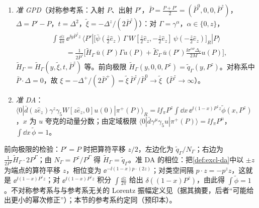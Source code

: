 \begin{definition}[准 GPD 与准 DA]\label{def:lamet-quasi-gpd}
\begin{enumerate}[label=(\roman*),leftmargin=2em,itemsep=1pt,topsep=2pt]
\item \emph{准 GPD}（对称参考系：入射 $P$、出射 $P'$，$\bar P=\frac{P+P'}2=(\bar P^0,0,0,\bar P^z)$，$\Delta=P'-P$，$t=\Delta^2$，$\tilde\xi=-\Delta^z/(2\bar P^z)$）：对 $\Gamma=\gamma^\alpha$，$\alpha\in\{0,z\}$，
\begin{equation}\label{eq:lamet-quasi-gpd}
\begin{split}
&\int\frac{\dd z}{4\pi}\,\ee^{\ii y\bar P^zz}\,\langle P'|\big[\bar\psi(\tfrac z2\hat e_z)\,\Gamma\, W[\tfrac z2\hat e_z,-\tfrac z2\hat e_z]\,\psi(-\tfrac z2\hat e_z)\big]_R|P\rangle\\
&\qquad=\frac1{2\bar P^z}\Big[\tilde H_\Gamma\,\bar u(P')\Gamma u(P)+\tilde E_\Gamma\,\bar u(P')\frac{\ii\sigma^{\alpha\nu}\Delta_\nu}{2M}u(P)\Big],
\end{split}
\end{equation}
$\tilde H_\Gamma=\tilde H_\Gamma(y,\tilde\xi,t,\bar P^z)$ 等。前向极限 $\tilde H_\Gamma(y,0,0,P^z)=\tilde q_\Gamma(y,P^z)$。对称系中 $\bar P\cdot\Delta=0$，故 $\xi=-\Delta^+/(2\bar P^+)=\tilde\xi\,\bar P^z/\bar P^0\to\tilde\xi$（$\bar P^z\to\infty$）。
\item \emph{准 DA}：$\langle0|\bar d(z\hat e_z)\gamma^z\gamma_5W[z\hat e_z,0]u(0)|\pi^+(P)\rangle_R=\ii f_\pi P^z\int\dd x\,\ee^{\ii(1-x)P^zz}\tilde\phi(x,P^z)$，$x$ 为 $u$ 夸克的动量分数；由定域极限 $\langle0|\bar d\gamma^\mu\gamma_5u|\pi^+(P)\rangle=\ii f_\pi P^\mu$，$\int\dd x\,\tilde\phi=1$。
\end{enumerate}
\end{definition}

前向极限的检验：$P'=P$ 时把算符平移 $z/2$，左边化为 $\tilde q_\Gamma/N_\Gamma$；右边为 $\frac1{2P^z}\tilde H_\Gamma\cdot2P^\Gamma$；由 $N_\Gamma=P^z/P^\Gamma$ 得 $\tilde H_\Gamma=\tilde q_\Gamma$。准 DA 的相位：把\cref{def:excl-da}中以 $\pm z$ 为端点的算符平移 $z$，相位变为 $\ee^{-\ii(1-x)p\cdot(2z)}$；对类空间隔 $p\cdot z=-p^zz$，这就是 $\ee^{\ii(1-x)P^zz}$；对 $\ee^{\ii(1-x)P^zz}$ 积分 $\int\frac{\dd z}{2\pi}$ 给出 $\delta((1-x)P^z)$，由此得 $\int\tilde\phi=1$。不对称参考系与与参考系无关的 Lorentz 振幅定义见\cite{Bhattacharya:2022aob}（据其摘要，后者“可能给出更小的幂次修正”）；本节的参考系约定同\cite{Su:2026eta}（预印本）。

